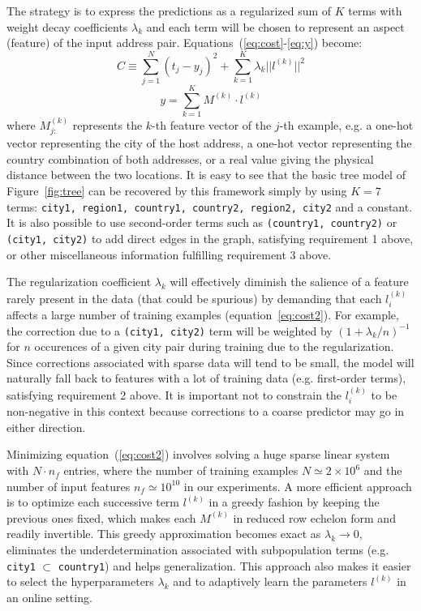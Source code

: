 \documentclass[10pt,a4paper,notitlepage,twocolumn]{article}
\begin{document}
The strategy is to express the predictions as a regularized sum of $K$ terms with weight decay coefficients $\lambda_k$ and each term will be chosen to represent an aspect (feature) of the input address pair.
Equations~(\ref{eq:cost}-\ref{eq:y}) become:
\begin{equation} \label{eq:cost2}
C \equiv \sum_{j=1}^N(t_j-y_j)^2 + \sum_{k=1}^K \lambda_k ||l^{(k)}||^2
\end{equation}
\begin{equation} \label{eq:y2}
y = \sum_{k=1}^K M^{(k)}\cdot l^{(k)}
\end{equation}
where $M_{j:}^{(k)}$ represents the $k$-th feature vector of the $j$-th example, e.g. a one-hot vector representing the city of the host address, a one-hot vector representing the country combination of both addresses, or a real value giving the physical distance between the two locations.
It is easy to see that the basic tree model of Figure~\ref{fig:tree} can be recovered by this framework simply by using $K=7$ terms: \texttt{city1, region1, country1, country2, region2, city2} and a constant.
%
It is also possible to use second-order terms such as \texttt{(country1, country2)} or \texttt{(city1, city2)} to add direct edges in the graph, satisfying requirement 1 above, or other miscellaneous information fulfilling requirement 3 above.

The regularization coefficient $\lambda_k$ will effectively diminish the salience of a feature rarely present in the data (that could be spurious) by demanding that each $l_i^{(k)}$ affects a large number of training examples (equation~\ref{eq:cost2}).
For example, the correction due to a \texttt{(city1, city2)} term will be weighted by $(1+\lambda_k/n)^{-1}$ for $n$ occurences of a given city pair during training due to the regularization.
Since corrections associated with sparse data will tend to be small, the model will naturally fall back to features with a lot of training data (e.g. first-order terms), satisfying requirement 2 above.
It is important not to constrain the $l^{(k)}_i$ to be non-negative in this context because corrections to a coarse predictor may go in either direction.

Minimizing equation~(\ref{eq:cost2}) involves solving a huge sparse linear system with $N\cdot n_f$ entries, where the number of training examples $N\simeq 2\times 10^6$ and the number of input features $n_f\simeq10^{10}$ in our experiments.
A more efficient approach is to optimize each successive term $l^{(k)}$ in a greedy fashion by keeping the previous ones fixed, which makes each $M^{(k)}$ in reduced row echelon form and readily invertible.
This greedy approximation becomes exact as $\lambda_k\rightarrow 0$, eliminates the underdetermination associated with subpopulation terms (e.g. \texttt{city1} $\subset$ \texttt{country1}) and helps generalization.
This approach also makes it easier to select the hyperparameters $\lambda_k$ and to adaptively learn the parameters $l^{(k)}$ in an online setting.
\end{document}
